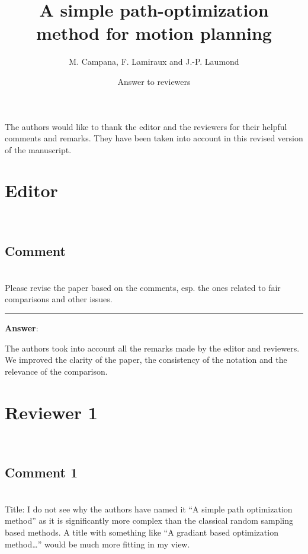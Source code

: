 \documentclass{scrartcl}
\begin{document}
\title{A simple path-optimization method for motion planning}
\author{M. Campana, F. Lamiraux and J.-P. Laumond}
\date{Answer to reviewers}
\maketitle

The authors would like to thank the editor and the reviewers for their helpful comments and remarks.
They have been taken into account in this revised version of the manuscript.

\section{Editor}

\hrulefill\\

\subsection{Comment}
\hrulefill\\

Please revise the paper based on the comments, esp. the ones related to fair comparisons and other issues.

\rule{\linewidth}{.1pt}
\textbf{Answer}:

The authors took into account all the remarks made by the editor and reviewers.
We improved the clarity of the paper, the consistency of the notation and the relevance of the comparison.

 
\section{Reviewer 1}
\label{r2}
\hrulefill\\

\subsection{Comment 1}
\hrulefill\\

Title:
I do not see why the authors have named it “A simple path optimization method” as it is significantly more complex than the classical random sampling based methods. A title with something like “A gradiant based optimization method…” would be much more fitting in my view.
\end{document}
